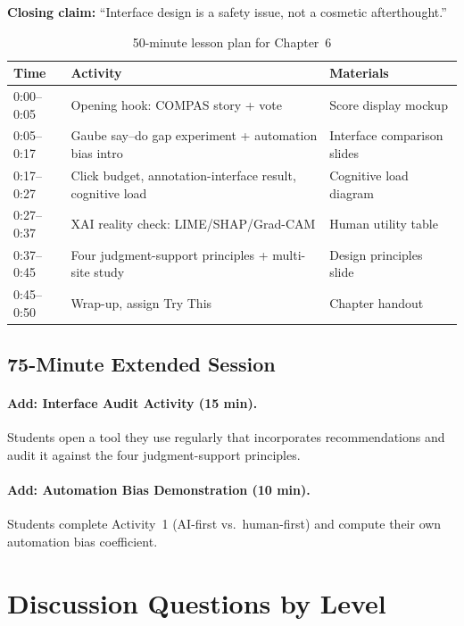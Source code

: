 \textbf{Closing claim:} ``Interface design is a safety issue, not a cosmetic afterthought.''

\begin{table}[htbp]
\caption{50-minute lesson plan for Chapter~6}
\label{tab:lesson-plan-ch06}
\centering
\begin{tabular}{@{}p{2.5cm}p{6cm}p{4cm}@{}}
\toprule
\textbf{Time} & \textbf{Activity} & \textbf{Materials} \\
\midrule
0:00--0:05 & Opening hook: COMPAS story + vote & Score display mockup \\
0:05--0:17 & Gaube say--do gap experiment + automation bias intro & Interface comparison slides \\
0:17--0:27 & Click budget, annotation-interface result, cognitive load & Cognitive load diagram \\
0:27--0:37 & XAI reality check: LIME/SHAP/Grad-CAM & Human utility table \\
0:37--0:45 & Four judgment-support principles + multi-site study & Design principles slide \\
0:45--0:50 & Wrap-up, assign Try This & Chapter handout \\
\bottomrule
\end{tabular}
\end{table}

\subsection{75-Minute Extended Session}

\paragraph{Add: Interface Audit Activity (15 min).} Students open a tool they use regularly that incorporates recommendations and audit it against the four judgment-support principles.

\paragraph{Add: Automation Bias Demonstration (10 min).} Students complete Activity~1 (AI-first vs.\ human-first) and compute their own automation bias coefficient.

\section{Discussion Questions by Level}

